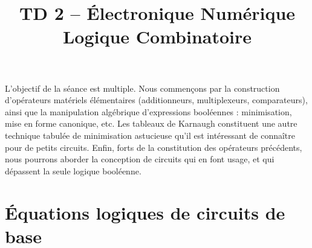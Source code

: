 \documentclass[a4paper,11pt]{article}
\title{\textcolor{primary}{\Huge\bfseries TD 2 -- Électronique Numérique}\\[0.5em] \Large Logique Combinatoire}
\author{}
\date{}
\begin{document}
\maketitle
\vspace{-2em}

\begin{notebox}
L'objectif de la séance est multiple. Nous commençons par la construction d'opérateurs matériels élémentaires (additionneurs, multiplexeurs, comparateurs), ainsi que la manipulation algébrique d'expressions booléennes : minimisation, mise en forme canonique, etc. Les tableaux de Karnaugh constituent une autre technique tabulée de minimisation astucieuse qu'il est intéressant de connaître pour de petits circuits. Enfin, forts de la constitution des opérateurs précédents, nous pourrons aborder la conception de circuits qui en font usage, et qui dépassent la seule logique booléenne.
\end{notebox}

\vspace{1em}

\section{Équations logiques de circuits de base}
\end{document}
